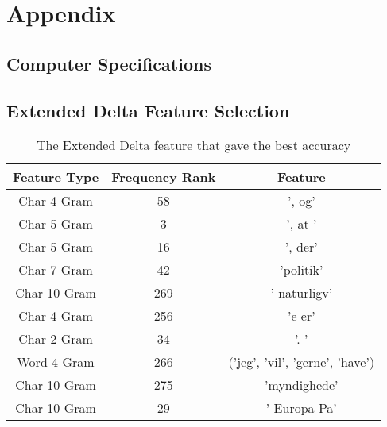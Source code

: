 \section{Appendix}

\subsection{Computer Specifications}

\subsection{Extended Delta Feature Selection}
\begin{table}
\centering
\caption{The Extended Delta feature that gave the best accuracy}
\begin{tabular}{ccc}
Feature Type & Frequency Rank & Feature \\ \hline
Char 4 Gram & 58 & ', og'\\
Char 5 Gram & 3 & ', at '\\
Char 5 Gram & 16 & ', der'\\
Char 7 Gram & 42 & 'politik'\\
Char 10 Gram & 269 & ' naturligv'\\
Char 4 Gram & 256 & 'e er'\\
Char 2 Gram & 34 & '. '\\
Word 4 Gram & 266 & ('jeg', 'vil', 'gerne', 'have')\\
Char 10 Gram & 275 & 'myndighede'\\
Char 10 Gram & 29 & ' Europa-Pa'\\
\end{tabular}
\end{table}


